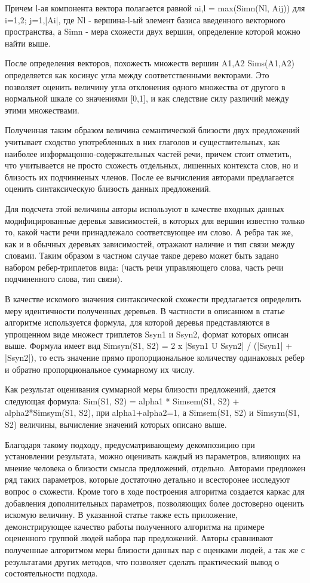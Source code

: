 Причем l-ая компонента вектора полагается равной 
ai,l = max(Simn(Nl, Aij)) 
для i=1,2; j=1,|Ai|,
где Nl - вершина-l-ый элемент базиса введенного векторного пространства,
а Simn - мера схожести двух вершин, определение которой можно найти выше.

После определения векторов, похожесть множеств вершин A1,A2 Sims(A1,A2) определяется
как косинус угла между соответственными векторами. 
Это позволяет оценить величину угла отклонения одного множества от другого в нормальной шкале
со значениями [0,1], и как следствие силу различий между этими множествами.

Полученная таким образом величина семантической близости двух предложений
учитывает сходство употребленных в них глаголов и существительных,
как наиболее информацонно-содержательных частей речи, 
причем стоит отметить, что учитывается не просто схожесть 
отдельных, лишенных контекста слов, но и близость их 
подчинненых членов. После ее вычисления авторами предлагается оценить
синтаксическую близость данных предложений.

Для подсчета этой величины авторы используют в качестве входных данных
модифицированные деревья зависимостей, в которых для вершин известно только то, 
какой части речи принадлежало соответсвующее им слово.
А ребра так же, как и в обычных деревьях зависимостей, отражают
наличие и тип связи между словами.
Таким образом в частном случае такое дерево может быть задано
набором ребер-триплетов вида:
(часть речи управляющего слова, часть речи подчиненного слова, тип связи).

В качестве искомого значения синтаксической схожести предлагается определить меру идентичности
полученных деревьев. В частности в описанном в статье алгоритме
используется формула, для которой деревья представляются в упрощенном виде
множест триплетов Ssyn1 и Ssyn2, формат которых описан выше.
Формула имеет вид Simsyn(S1, S2) = 2 x |Ssyn1 U Ssyn2| / (|Ssyn1| + |Ssyn2|), 
то есть значение прямо пропорциональное количеству одинаковых ребер
и обратно пропорциональное суммарному их числу.


Как результат оценивания суммарной меры близости предложений, 
дается следующая формула:
Sim(S1, S2) = alpha1 * Simsem(S1, S2) + alpha2*Simsym(S1, S2), при alpha1+alpha2=1,
а Simsem(S1, S2) и Simsym(S1, S2) величины, вычисление значений которых
описано выше.

Благодаря такому подходу, предусматривающему декомпозицию при установлении результата, 
можно оценивать каждый из параметров, влияющих на мнение человека о близости
смысла предложений, отдельно. Авторами предложен ряд таких параметров, 
которые достаточно детально и всесторонее исследуют вопрос о схожести. Кроме того
в ходе построения алгоритма создается каркас для добавления дополнительных параметров,
позволяющих более достоверно оценить искомую величину. 
В указанной статье также есть приложение, демонстрирующее качество работы
полученного алгоритма на примере оцененного группой людей набора пар предложений.
Авторы сравнивают полученные алгоритмом меры близости данных пар с оценками людей, 
а так же с результатами других методов, что позволяет сделать практический вывод
о состоятельности подхода.


